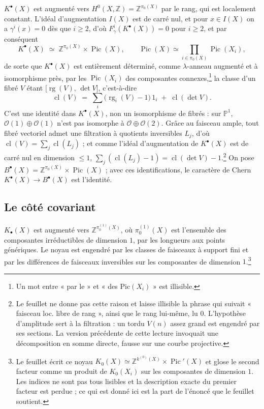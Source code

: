 \documentclass[11pt,a4paper]{article}
\begin{document}
$K^{\bullet}(X)$ est augmenté vers $H^{0}(X, \mathbb{Z}) = \mathbb{Z}^{\pi_{0}(X)}$
par le rang, qui est localement constant. L'idéal d'augmentation $I(X)$ est
de carré nul, et pour $x \in I(X)$ on a $\gamma^{i}(x) = 0$ dès que
$i \geqslant 2$, d'où
$F^{i}_{\gamma}(K^{\bullet}(X)) = 0$ pour $i \geqslant 2$, et par
conséquent
\[
  K^{\bullet}(X) \;\simeq\; \mathbb{Z}^{\pi_{0}(X)} \times \operatorname{Pic}(X),
  \qquad
  \operatorname{Pic}(X) \simeq \prod_{i \in \pi_{0}(X)} \operatorname{Pic}(X_{i}),
\]
de sorte que $K^{\bullet}(X)$ est entièrement déterminé, comme $\lambda$-anneau
augmenté et à isomorphisme près, par les $\operatorname{Pic}(X_{i})$ des
composantes connexes,\footnote{Un mot entre « par le » et « des
$\mathrm{Pic}(X_{i})$ » est illisible.} la classe d'un fibré $V$ étant
$\bigl[\operatorname{rg}(V),\, \det V\bigr]$,
c'est-à-dire
\[
  \operatorname{cl}(V) \;=\; \sum_{i} \bigl(\operatorname{rg}_{i}(V) - 1\bigr)\,1_{i}
  \;+\; \operatorname{cl}(\det V).
\]
C'est une identité dans $K^{\bullet}(X)$, non un isomorphisme de fibrés :
sur $\mathbb{P}^{1}$, $\mathcal{O}(1) \oplus \mathcal{O}(1)$ n'est pas
isomorphe à $\mathcal{O} \oplus \mathcal{O}(2)$. Grâce au faisceau ample, tout
fibré vectoriel admet une filtration à quotients inversibles $L_{j}$, d'où
$\operatorname{cl}(V) = \sum_{j} \operatorname{cl}(L_{j})$ ; et comme l'idéal
d'augmentation de $K^{\bullet}(X)$ est de carré nul en dimension $\leqslant
1$, $\sum_{j} (\operatorname{cl}(L_{j}) - 1) = \operatorname{cl}(\det V) -
1$.\footnote{Le feuillet ne donne pas cette raison et laisse illisible la
phrase qui suivait « faisceau loc. libre de rang », ainsi que le rang
lui-même, lu $0$. L'hypothèse d'amplitude sert à la filtration : un tordu
$V(n)$ assez grand est engendré par ses sections. La version précédente de
cette lecture invoquait une décomposition en somme directe, fausse sur une
courbe projective.} On pose $B^{\bullet}(X) = \mathbb{Z}^{\pi_{0}(X)}
\times \operatorname{Pic}(X)$ ; avec ces identifications, le caractère de
Chern $K^{\bullet}(X) \to B^{\bullet}(X)$ est l'identité.

\subsection*{Le côté covariant}

$K_{\bullet}(X)$ est augmenté vers $\mathbb{Z}^{\pi_{0}^{(1)}(X)}$, où
$\pi_{0}^{(1)}(X)$ est l'ensemble des composantes irréductibles de dimension
$1$, par les longueurs aux points génériques. Le noyau est engendré par les
classes de faisceaux à support fini et par les différences de faisceaux
inversibles sur les composantes de dimension $1$.\footnote{Le feuillet écrit ce
noyau $K_{0}(X) \simeq \mathbb{Z}^{k^{(0)}(X)} \times \operatorname{Pic}'(X)$
et glose le second facteur comme un produit de $K_{0}(X_{i})$ sur les
composantes de dimension $1$. Les indices ne sont pas tous lisibles et la
description exacte du premier facteur est perdue ; ce qui est donné ici est la
part de l'énoncé que le feuillet soutient.}
\end{document}
